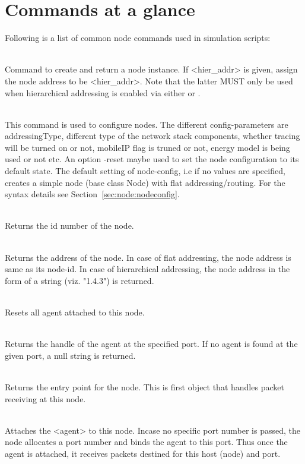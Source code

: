\section{Commands at a glance}
\label{sec:nodescommand}
\begin{flushleft}

Following is a list of common node commands used in simulation scripts:

\\ %
Command to create and return a node instance. If <hier\_addr> is given,
assign the node address to be <hier\_addr>. Note that the latter MUST
only be used when hierarchical addressing is enabled via either
 or 
. 

\\%
This command is used to configure nodes. The different config-parameters
are addressingType, different type of the network stack components,
whether tracing will be turned on or not, mobileIP flag is truned or not,
energy model is being used or not etc. An option -reset maybe used to set
the node configuration to its default state. The default setting of 
node-config, i.e if no values are specified, creates a simple node (base
class Node) with flat addressing/routing. For the syntax details see
Section~\ref{sec:node:nodeconfig}.

\\%
Returns the id number of the node.

\\%
Returns the address of the node. In case of flat addressing, the node address
is same as its node-id. In case of hierarchical addressing, the node address
in the form of a string (viz. "1.4.3") is returned.

 \\%
Resets all agent attached to this node.

 \\%
Returns the handle of the agent at the specified port. If no agent is found
at the given port, a null string is returned.

\\%
Returns the entry point for the node. This is first object that
handles packet receiving at this node.

\\%
Attaches the <agent> to this node. Incase no specific port number is passed,
the node allocates a port number and binds the agent to this port. Thus once
the agent is attached, it receives packets destined for this host
(node) and port. 


\end{flushleft}
